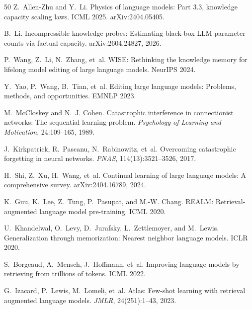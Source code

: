\documentclass[11pt]{article}
\begin{document}
\begin{thebibliography}{50}
Z.~Allen-Zhu and Y.~Li.
\newblock Physics of language models: Part 3.3, knowledge capacity scaling laws.
\newblock ICML 2025. arXiv:2404.05405.

B.~Li.
\newblock Incompressible knowledge probes: Estimating black-box {LLM} parameter
  counts via factual capacity.
\newblock arXiv:2604.24827, 2026.

P.~Wang, Z.~Li, N.~Zhang, et~al.
\newblock WISE: Rethinking the knowledge memory for lifelong model editing of large language models.
\newblock NeurIPS 2024.

Y.~Yao, P.~Wang, B.~Tian, et~al.
\newblock Editing large language models: Problems, methods, and opportunities.
\newblock EMNLP 2023.

M.~McCloskey and N.~J. Cohen.
\newblock Catastrophic interference in connectionist networks: The sequential learning problem.
\newblock \emph{Psychology of Learning and Motivation}, 24:109--165, 1989.

J.~Kirkpatrick, R.~Pascanu, N.~Rabinowitz, et~al.
\newblock Overcoming catastrophic forgetting in neural networks.
\newblock \emph{PNAS}, 114(13):3521--3526, 2017.

H.~Shi, Z.~Xu, H.~Wang, et~al.
\newblock Continual learning of large language models: A comprehensive survey.
\newblock arXiv:2404.16789, 2024.

K.~Guu, K.~Lee, Z.~Tung, P.~Pasupat, and M.-W. Chang.
\newblock REALM: Retrieval-augmented language model pre-training.
\newblock ICML 2020.

U.~Khandelwal, O.~Levy, D.~Jurafsky, L.~Zettlemoyer, and M.~Lewis.
\newblock Generalization through memorization: Nearest neighbor language models.
\newblock ICLR 2020.

S.~Borgeaud, A.~Mensch, J.~Hoffmann, et~al.
\newblock Improving language models by retrieving from trillions of tokens.
\newblock ICML 2022.

G.~Izacard, P.~Lewis, M.~Lomeli, et~al.
\newblock Atlas: Few-shot learning with retrieval augmented language models.
\newblock \emph{JMLR}, 24(251):1--43, 2023.


\end{thebibliography}
\end{document}
